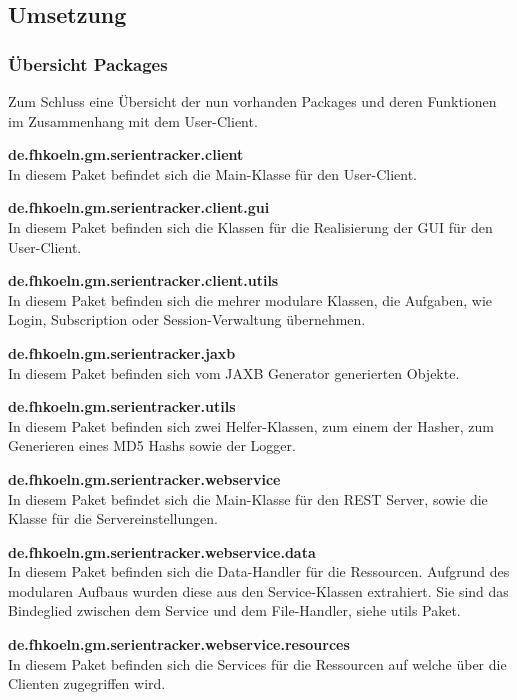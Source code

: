 \newpage
\subsection{Umsetzung}

\subsubsection{Übersicht Packages}

Zum Schluss eine Übersicht der nun vorhanden Packages und deren Funktionen im Zusammenhang mit dem User-Client.


\textbf{de.fhkoeln.gm.serientracker.client}\\
In diesem Paket befindet sich die Main-Klasse für den User-Client.

\textbf{de.fhkoeln.gm.serientracker.client.gui}\\
In diesem Paket befinden sich die Klassen für die Realisierung der GUI für den User-Client.

\textbf{de.fhkoeln.gm.serientracker.client.utils}\\
In diesem Paket befinden sich die mehrer modulare Klassen, die Aufgaben, wie Login, Subscription oder Session-Verwaltung übernehmen.

\textbf{de.fhkoeln.gm.serientracker.jaxb}\\
In diesem Paket befinden sich vom JAXB Generator generierten Objekte.

\textbf{de.fhkoeln.gm.serientracker.utils}\\
In diesem Paket befinden sich zwei Helfer-Klassen, zum einem der Hasher, zum Generieren eines MD5 Hashs sowie der Logger.

\textbf{de.fhkoeln.gm.serientracker.webservice}\\
In diesem Paket befindet sich die Main-Klasse für den REST Server, sowie die Klasse für die Servereinstellungen.

\textbf{de.fhkoeln.gm.serientracker.webservice.data}\\
In diesem Paket befinden sich die Data-Handler für die Ressourcen. Aufgrund des modularen Aufbaus wurden diese aus den Service-Klassen extrahiert. Sie sind das Bindeglied zwischen dem Service und dem File-Handler, siehe utils Paket.

\textbf{de.fhkoeln.gm.serientracker.webservice.resources}\\
In diesem Paket befinden sich die Services für die Ressourcen auf welche über die Clienten zugegriffen wird.

